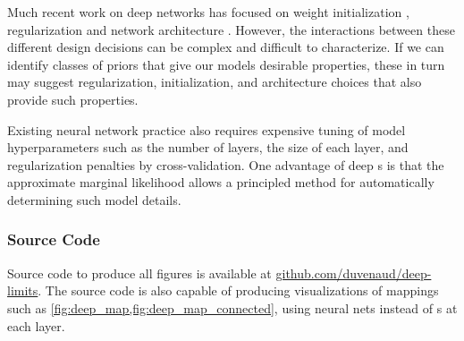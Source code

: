 Much recent work on deep networks has focused on weight initialization \citep{martens2010deep}, regularization \citep{lee2007sparse} and network architecture \citep{gens2013learning}.
However, the interactions between these different design decisions can be complex and difficult to characterize.
If we can identify classes of priors that give our models desirable properties, these in turn may suggest regularization, initialization, and architecture choices that also provide such properties.

Existing neural network practice also requires expensive tuning of model hyperparameters such as the number of layers, the size of each layer, and regularization penalties by cross-validation.
One advantage of deep \gp{}s is that the approximate marginal likelihood allows a principled method for automatically determining such model details.



\subsubsection{Source Code}
Source code to produce all figures is available at \url{github.com/duvenaud/deep-limits}.
The source code is also capable of producing visualizations of mappings such as \cref{fig:deep_map,fig:deep_map_connected}, using neural nets instead of \gp{}s at each layer.




